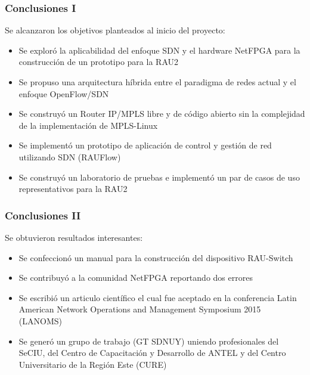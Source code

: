 \documentclass{beamer}
\begin{document}
\begin{frame}
\frametitle{Conclusiones I} 

Se alcanzaron los objetivos planteados al inicio del proyecto: 
\begin{itemize}[<+->]

\item Se explor\'o la aplicabilidad del enfoque SDN y el hardware NetFPGA para la construcci\'on de un prototipo para la RAU2

\item Se propuso una arquitectura h\'ibrida entre el paradigma de redes actual y el enfoque OpenFlow/SDN

\item Se construy\'o un Router IP/MPLS libre y de c\'odigo abierto sin la complejidad de la implementaci\'on de MPLS-Linux

\item Se implement\'o un prototipo de aplicaci\'on de control y gesti\'on de red utilizando SDN (RAUFlow) 

\item Se construy\'o un laboratorio de pruebas e implement\'o un par de casos de uso representativos para la RAU2

\end{itemize}
\end{frame}


\begin{frame}
\frametitle{Conclusiones II} 

Se obtuvieron resultados interesantes:
\begin{itemize}[<+->]
\item Se confeccion\'o un manual para la construcci\'on del dispositivo RAU-Switch

\item Se contribuy\'o a la comunidad NetFPGA reportando dos errores

\item Se escribió un articulo cient\'ifico el cual fue aceptado en la conferencia Latin American Network Operations and Management Symposium 2015 (LANOMS)

\item Se gener\'o un grupo de trabajo (GT SDNUY) uniendo profesionales del SeCIU, del Centro de Capacitación y Desarrollo de ANTEL y del Centro Universitario de la Región Este (CURE) 

\end{itemize}

\end{frame}
\end{document}
